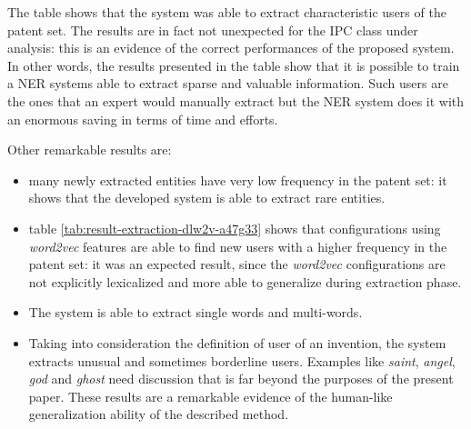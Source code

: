 \documentclass[]{book}
\theoremstyle{definition}
\theoremstyle{definition}
\theoremstyle{definition}
\theoremstyle{remark}
\begin{document}
The table shows that the system was able to extract characteristic users
of the patent set. The results are in fact not unexpected for the IPC
class under analysis: this is an evidence of the correct performances of
the proposed system. In other words, the results presented in the table
show that it is possible to train a NER systems able to extract sparse
and valuable information. Such users are the ones that an expert would
manually extract but the NER system does it with an enormous saving in
terms of time and efforts.

Other remarkable results are:

\begin{itemize}
\item
  many newly extracted entities have very low frequency in the patent
  set: it shows that the developed system is able to extract rare
  entities.
\item
  table \ref{tab:result-extraction-dlw2v-a47g33} shows that
  configurations using \emph{word2vec} features are able to find new
  users with a higher frequency in the patent set: it was an expected
  result, since the \emph{word2vec} configurations are not explicitly
  lexicalized and more able to generalize during extraction phase.
\item
  The system is able to extract single words and multi-words.
\item
  Taking into consideration the definition of user of an invention, the
  system extracts unusual and sometimes borderline users. Examples like
  \emph{saint}, \emph{angel}, \emph{god} and \emph{ghost} need
  discussion that is far beyond the purposes of the present paper. These
  results are a remarkable evidence of the human-like generalization
  ability of the described method.
\end{itemize}
\end{document}

